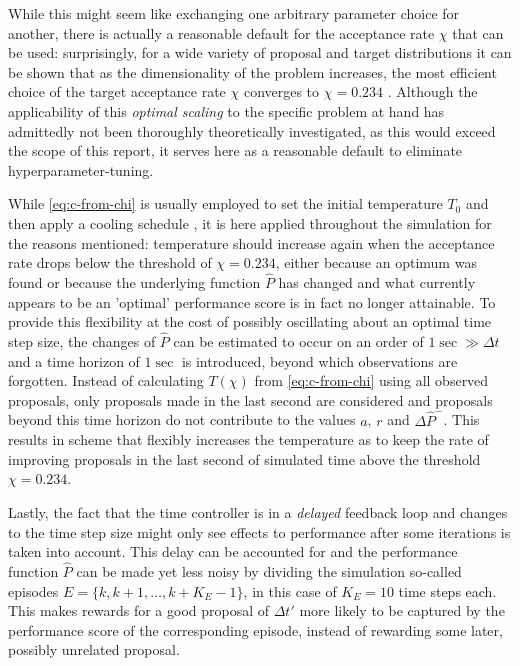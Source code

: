 \documentclass[oneside, a4paper]{book}
\newcommand\br[1]{\left(#1\right)}
\begin{document}
    While this might seem like exchanging one arbitrary parameter choice for another, there is actually a reasonable default for the acceptance rate $\chi$ that can be used: surprisingly, for a wide variety of proposal and target distributions it can be shown that as the dimensionality of the problem increases, the most efficient choice of the target acceptance rate $\chi$ converges to $\chi=0.234$ \autocites{moving-beyond-0234}{exploring-0234-arxiv}. Although the applicability of this \textit{optimal scaling} to the specific problem at hand has admittedly not been thoroughly theoretically investigated, as this would exceed the scope of this report, it serves here as a reasonable default to eliminate hyperparameter-tuning. 
    
    While \autoref{eq:c-from-chi} is usually employed to set the initial temperature $T_0$ and then apply a cooling schedule \autocite{simulated-annealing}, it is here applied throughout the simulation for the reasons mentioned: temperature should increase again when the acceptance rate drops below the threshold of $\chi=0.234$, either because an optimum was found or because the underlying function $\hat{P}$ has changed and what currently appears to be an 'optimal' performance score is in fact no longer attainable. 
    To provide this flexibility at the cost of possibly oscillating about an optimal time step size, the changes of $\hat{P}$ can be estimated to occur on an order of $1\sec \gg \Delta t$ and a time horizon of $1\sec$ is introduced, beyond which observations are forgotten. Instead of calculating $T\br{\chi}$ from \autoref{eq:c-from-chi} using all observed proposals, only proposals made in the last second are considered and proposals beyond this time horizon do not contribute to the values $a$, $r$ and $\Delta \hat{P}^-$. This results in scheme that flexibly increases the temperature as to keep the rate of improving proposals in the last second of simulated time above the threshold $\chi=0.234$. 


    Lastly, the fact that the time controller is in a \textit{delayed} feedback loop and changes to the time step size might only see effects to performance after some iterations is taken into account. This delay can be accounted for and the performance function $\hat{P}$ can be made yet less noisy by dividing the simulation so-called episodes $E=\{k, k+1, \dots, k+K_{E}-1\}$, in this case of $K_{E}=10$ time steps each. This makes rewards for a good proposal of $\Delta t'$ more likely to be captured by the performance score of the corresponding episode, instead of rewarding some later, possibly unrelated proposal.
    
\end{document}
